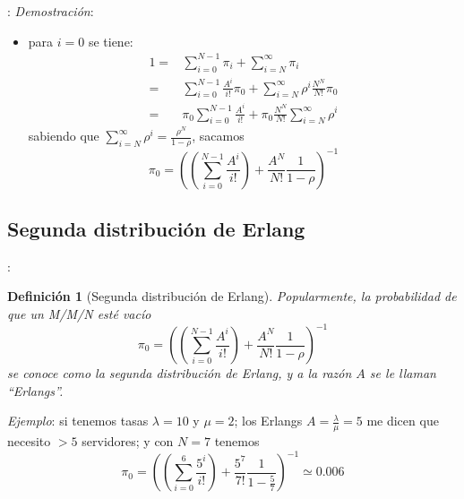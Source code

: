 \documentclass[xcolor={x11names}]{beamer}
\newtheorem{definicion}{Definición}[section]
\begin{document}
\begin{frame}{\secname: \subsecname}
    \textit{Demostración}:
    \begin{itemize}
        \item para $i=0$ se tiene:
            \begin{align*}
                1=&\sum_{i=0}^{N-1}\pi_i
                 + \sum_{i=N}^\infty \pi_i\\
                 =& \sum_{i=0}^{N-1}
                 \frac{A^i}{i!}\pi_0
                 + \sum_{i=N}^\infty
                 \rho^i \frac{N^N}{N!}\pi_0\\
                 =& \pi_0\sum_{i=0}^{N-1}
                 \frac{A^i}{i!}
                 + \pi_0 \frac{N^N}{N!}\sum_{i=N}^\infty
                 \rho^i
            \end{align*}
            sabiendo que
            $\sum_{i=N}^\infty
            \rho^i=\tfrac{\rho^N}{1-\rho}$,
            sacamos
            \begin{equation*}
            \pi_0=\left(
                \left(\sum_{i=0}^{N-1}
                \frac{A^i}{i!}
                \right)
                + \frac{A^N}{N!}\frac{1}{1-\rho}
            \right)^{-1}
            \end{equation*}
    \end{itemize}
\end{frame}



\subsection{Segunda distribución de Erlang}
\begin{frame}{\secname: \subsecname}
    \begin{definicion}[Segunda distribución de
        Erlang]
        Popularmente, la probabilidad de que
        un M/M/N esté vacío
                \begin{equation*}
                \pi_0=\left(
                    \left(\sum_{i=0}^{N-1}
                    \frac{A^i}{i!}
                    \right)
                    + \frac{A^N}{N!}\frac{1}{1-\rho}
                \right)^{-1}
                \end{equation*}
        se conoce como la segunda
        distribución de Erlang, y a la razón
        $A$ se le llaman ``Erlangs''.
    \end{definicion}

    \vfill

    \textit{Ejemplo}: si tenemos tasas
    $\lambda=10$ y $\mu=2$; los Erlangs
    $A=\tfrac{\lambda}{\mu}=5$ me dicen que
    necesito $>5$ servidores; y con $N=7$
    tenemos
    \begin{equation*}
    \pi_0=\left(
        \left(\sum_{i=0}^{6}
        \frac{5^i}{i!}
        \right)
        + \frac{5^7}{7!}\frac{1}{1-\tfrac{5}{7}}
    \right)^{-1}
    \simeq 0.006
    \end{equation*}
\end{frame}
\end{document}

